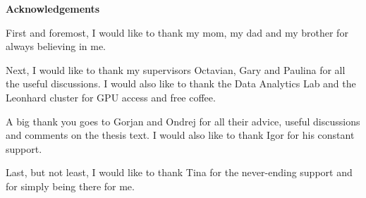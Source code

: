 \newenvironment{acknowledgements}%
    {
    \begin{center}%
    \bfseries Acknowledgements\end{center}}%
    {\vfill\null}
    
\begin{acknowledgements}

First and foremost, I would like to thank my mom, my dad and my brother for always believing in me.

Next, I would like to thank my supervisors Octavian, Gary and Paulina for all the useful discussions. I would also like to thank the Data Analytics Lab and the Leonhard cluster for GPU access and free coffee.

A big thank you goes to Gorjan and Ondrej for all their advice, useful discussions and comments on the thesis text. I would also like to thank Igor for his constant support.

Last, but not least, I would like to thank Tina for the never-ending support and for simply being there for me.

\end{acknowledgements}